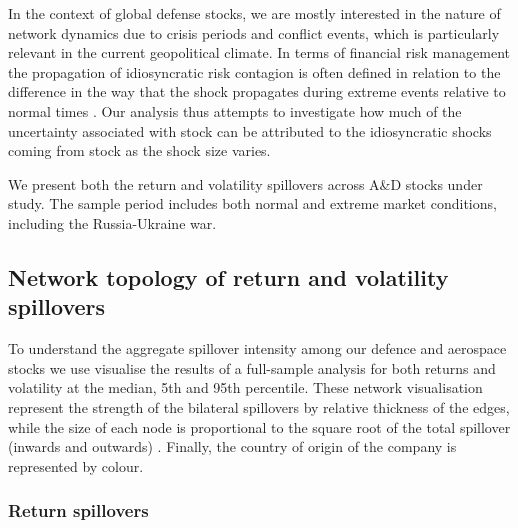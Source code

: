 \documentclass[
  number]{elsarticle}
\begin{document}
In the context of global defense stocks, we are mostly interested in the
nature of network dynamics due to crisis periods and conflict events,
which is particularly relevant in the current geopolitical climate. In
terms of financial risk management the propagation of idiosyncratic risk
contagion is often defined in relation to the difference in the way that
the shock propagates during extreme events relative to normal times
\citep{Londono.2019}. Our analysis thus attempts to investigate how much
of the uncertainty associated with stock can be attributed to the
idiosyncratic shocks coming from stock as the shock size varies.

We present both the return and volatility spillovers across A\&D stocks
under study. The sample period includes both normal and extreme market
conditions, including the Russia-Ukraine war.

\hypertarget{network-topology-of-return-and-volatility-spillovers}{%
\subsection{Network topology of return and volatility
spillovers}\label{network-topology-of-return-and-volatility-spillovers}}

To understand the aggregate spillover intensity among our defence and
aerospace stocks we use visualise the results of a full-sample analysis
for both returns and volatility at the median, 5th and 95th percentile.
These network visualisation represent the strength of the bilateral
spillovers by relative thickness of the edges, while the size of each
node is proportional to the square root of the total spillover (inwards
and outwards) \citep{Ando.2022}. Finally, the country of origin of the
company is represented by colour.

\hypertarget{return-spillovers}{%
\subsubsection{Return spillovers}\label{return-spillovers}}
\end{document}
